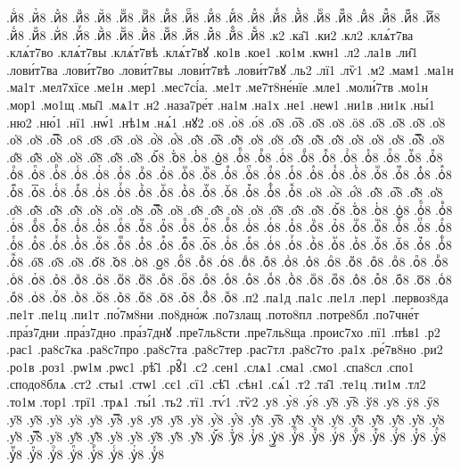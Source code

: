 {.йⷭ8
.йⷮ8
.йⷯ8
.йⷰ8
.йⷱ8
.йⷲ8
.йⷳ8
.йⷴ8
.йⷵ8
.йⷶ8
.йⷷ8
.йⷸ8
.йⷹ8
.йⷺ8
.йⷻ8
.йⷼ8
.йⷽ8
.йⷾ8
.йⷿ8
.й꙯8
.йꙴ8
.йꙵ8
.йꙶ8
.йꙷ8
.йꙸ8
.йꙹ8
.йꙺ8
.йꙻ8
.й꙼8
.й꙽8
.йꚞ8
.йꚟ8
.к2
.ка̑1
.ки2
.кл2
.клѧ́т7ва
.клѧ́т7во
.клѧ́т7вы
.клѧ́т7вѣ
.клѧ́т7вꙋ
.ко1в
.кое1
.ко1м
.кѡн1
.л2
.ла1в
.ли̑1
.лови́т7ва
.лови́т7во
.лови́т7вы
.лови́т7вѣ
.лови́т7вꙋ
.ль2
.лї1
.лѷ1
.м2
.мам1
.ма1н
.ма1т
.мел7хїсе
.ме1н
.мер1
.мес7сі́а.
.ме1т
.ме7т8не́нїе
.мле1
.моли́7тв
.мо1н
.мор1
.мо1щ
.мы̑1
.мѧ1т
.н2
.наза7ре́т
.на1м
.на1х
.не1
.неѡ1
.ни1в
.ни1к
.ны́1
.ню2
.ню́1
.нї1
.нѡ́1
.нѣ1м
.нѧ́1
.нꙋ2
.о8
.о̀8
.о́8
.о̂8
.о̅8
.о̆8
.о̇8
.ӧ8
.о̋8
.о̏8
.о̑8
.о̓8
.о̔8
.о̾8
.о̿8
.о͘8
.о҃8
.о҄8
.о҅8
.о҅̀8
.о҅́8
.о҅̂8
.о҅̅8
.о҅̆8
.о҅̇8
.о҅̈8
.о҅̋8
.о҅̏8
.о҅̑8
.о҅̓8
.о҅̔8
.о҅̾8
.о҅̿8
.о҅͘8
.о҅҃8
.о҅҄8
.о҅҅8
.о҅҆8
.о҅҇8
.о҅᷀8
.о҅᷁8
.о҅᷶8
.о᷷҅8
.о᷸҅8
.о᷹҅8
.о҅ⷠ8
.о҅ⷡ8
.о҅ⷢ8
.о҅ⷣ8
.о҅ⷤ8
.о҅ⷥ8
.о҅ⷦ8
.о҅ⷧ8
.о҅ⷨ8
.о҅ⷩ8
.о҅ⷪ8
.о҅ⷫ8
.о҅ⷬ8
.о҅ⷭ8
.о҅ⷮ8
.о҅ⷯ8
.о҅ⷰ8
.о҅ⷱ8
.о҅ⷲ8
.о҅ⷳ8
.о҅ⷴ8
.о҅ⷵ8
.о҅ⷶ8
.о҅ⷷ8
.о҅ⷸ8
.о҅ⷹ8
.о҅ⷺ8
.о҅ⷻ8
.о҅ⷼ8
.о҅ⷽ8
.о҅ⷾ8
.о҅ⷿ8
.о҅꙯8
.о҅ꙴ8
.о҅ꙵ8
.о҅ꙶ8
.о҅ꙷ8
.о҅ꙸ8
.о҅ꙹ8
.о҅ꙺ8
.о҅ꙻ8
.о҅꙼8
.о҅꙽8
.о҅ꚞ8
.о҅ꚟ8
.о҆8
.о҆̀8
.о҆́8
.о҆̂8
.о҆̅8
.о҆̆8
.о҆̇8
.о҆̈8
.о҆̋8
.о҆̏8
.о҆̑8
.о҆̓8
.о҆̔8
.о҆̾8
.о҆̿8
.о҆͘8
.о҆҃8
.о҆҄8
.о҆҅8
.о҆҆8
.о҆҇8
.о҆᷀8
.о҆᷁8
.о҆᷶8
.о᷷҆8
.о᷸҆8
.о᷹҆8
.о҆ⷠ8
.о҆ⷡ8
.о҆ⷢ8
.о҆ⷣ8
.о҆ⷤ8
.о҆ⷥ8
.о҆ⷦ8
.о҆ⷧ8
.о҆ⷨ8
.о҆ⷩ8
.о҆ⷪ8
.о҆ⷫ8
.о҆ⷬ8
.о҆ⷭ8
.о҆ⷮ8
.о҆ⷯ8
.о҆ⷰ8
.о҆ⷱ8
.о҆ⷲ8
.о҆ⷳ8
.о҆ⷴ8
.о҆ⷵ8
.о҆ⷶ8
.о҆ⷷ8
.о҆ⷸ8
.о҆ⷹ8
.о҆ⷺ8
.о҆ⷻ8
.о҆ⷼ8
.о҆ⷽ8
.о҆ⷾ8
.о҆ⷿ8
.о҆꙯8
.о҆ꙴ8
.о҆ꙵ8
.о҆ꙶ8
.о҆ꙷ8
.о҆ꙸ8
.о҆ꙹ8
.о҆ꙺ8
.о҆ꙻ8
.о҆꙼8
.о҆꙽8
.о҆ꚞ8
.о҆ꚟ8
.о҇8
.о᷀8
.о᷁8
.о᷶8
.о᷷8
.о᷸8
.о᷹8
.оⷠ8
.оⷡ8
.оⷢ8
.оⷣ8
.оⷤ8
.оⷥ8
.оⷦ8
.оⷧ8
.оⷨ8
.оⷩ8
.оⷪ8
.оⷫ8
.оⷬ8
.оⷭ8
.оⷮ8
.оⷯ8
.оⷰ8
.оⷱ8
.оⷲ8
.оⷳ8
.оⷴ8
.оⷵ8
.оⷶ8
.оⷷ8
.оⷸ8
.оⷹ8
.оⷺ8
.оⷻ8
.оⷼ8
.оⷽ8
.оⷾ8
.оⷿ8
.о꙯8
.оꙴ8
.оꙵ8
.оꙶ8
.оꙷ8
.оꙸ8
.оꙹ8
.оꙺ8
.оꙻ8
.о꙼8
.о꙽8
.оꚞ8
.оꚟ8
.п2
.па1д
.па1с
.пе1л
.пер1
.первоз8да
.пе1т
.пе1ц
.пи1т
.по́7м8ни
.по8дно́ж
.по7злащ
.пото8пл
.потре8бл
.по7чне́т
.пра́з7дни
.пра́з7дно
.пра́з7днꙋ
.пре7ль8сти
.пре7ль8ща
.проис7хо
.пї1
.пѣв1
.р2
.рас1
.ра8с7ка
.ра8с7про
.ра8с7та
.ра8с7тер
.рас7тл
.ра8с7то
.ра1х
.ре́7в8но
.ри2
.ро1в
.роз1
.рѡ1м
.рѡс1
.рѣ̑1
.рꙋ̑1
.с2
.сен1
.слѧ1
.сма1
.смо1
.спа8сл
.спо1
.сподо8блѧ
.ст2
.сты1
.стѡ1
.сє1
.сї1
.сѣ̑1
.сѣн1
.сѧ́1
.т2
.та̑1
.те1ц
.ти1м
.тл2
.то1м
.тор1
.трї1
.трѧ1
.ты́1
.ть2
.тї1
.тѵ́1
.тѷ2
.у8
.у̀8
.у́8
.у̂8
.у̅8
.ў8
.у̇8
.ӱ8
.ӳ8
.у̏8
.у̑8
.у̓8
.у̔8
.у̾8
.у̿8
.у͘8
.у҃8
.у҄8
.у҅8
.у҅̀8
.у҅́8
.у҅̂8
.у҅̅8
.у҅̆8
.у҅̇8
.у҅̈8
.у҅̋8
.у҅̏8
.у҅̑8
.у҅̓8
.у҅̔8
.у҅̾8
.у҅̿8
.у҅͘8
.у҅҃8
.у҅҄8
.у҅҅8
.у҅҆8
.у҅҇8
.у҅᷀8
.у҅᷁8
.у҅᷶8
.у᷷҅8
.у᷸҅8
.у᷹҅8
.у҅ⷠ8
.у҅ⷡ8
.у҅ⷢ8
.у҅ⷣ8
.у҅ⷤ8
.у҅ⷥ8
.у҅ⷦ8
.у҅ⷧ8
.у҅ⷨ8
.у҅ⷩ8
.у҅ⷪ8
.у҅ⷫ8
.у҅ⷬ8
.у҅ⷭ8
.у҅ⷮ8
.у҅ⷯ8
}
